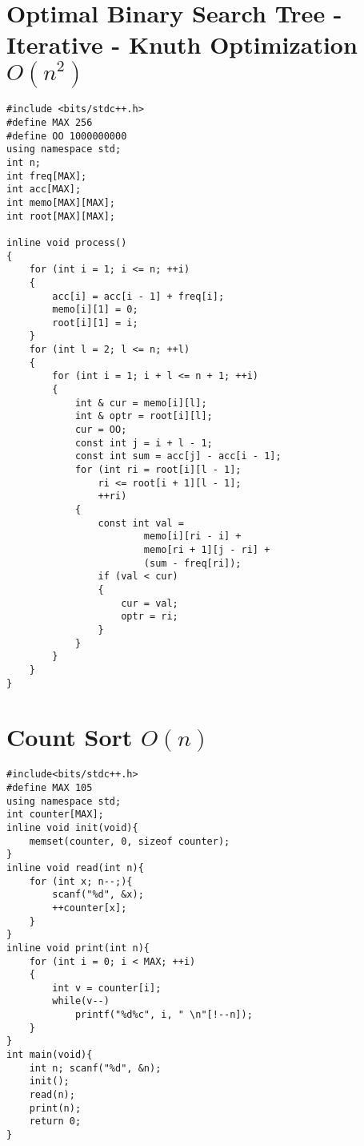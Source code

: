 \documentclass[12pt]{book}
\begin{document}
\section{Optimal Binary Search Tree - Iterative - Knuth Optimization $O(n^2)$}
\begin{verbatim}
#include <bits/stdc++.h>
#define MAX 256
#define OO 1000000000
using namespace std;
int n;
int freq[MAX];
int acc[MAX];
int memo[MAX][MAX];
int root[MAX][MAX];

inline void process()
{
	for (int i = 1; i <= n; ++i)
	{
		acc[i] = acc[i - 1] + freq[i];
		memo[i][1] = 0;
		root[i][1] = i;
	}
	for (int l = 2; l <= n; ++l)
	{
		for (int i = 1; i + l <= n + 1; ++i)
		{
			int & cur = memo[i][l];
			int & optr = root[i][l];
			cur = OO;
			const int j = i + l - 1;
			const int sum = acc[j] - acc[i - 1];
			for (int ri = root[i][l - 1];
				ri <= root[i + 1][l - 1];
				++ri)
			{
				const int val =
						memo[i][ri - i] +
						memo[ri + 1][j - ri] +
						(sum - freq[ri]);
				if (val < cur)
				{
					cur = val;
					optr = ri;
				}
			}
		}
	}
}
\end{verbatim}
\section{Count Sort $O(n)$}
\begin{verbatim}
#include<bits/stdc++.h>
#define MAX 105
using namespace std;
int counter[MAX];
inline void init(void){
	memset(counter, 0, sizeof counter);
}
inline void read(int n){
	for (int x; n--;){
		scanf("%d", &x);
		++counter[x];
	}
}
inline void print(int n){
	for (int i = 0; i < MAX; ++i)
	{
		int v = counter[i];
		while(v--)
			printf("%d%c", i, " \n"[!--n]);
	}
}
int main(void){
	int n; scanf("%d", &n);
	init();
	read(n);
	print(n);
	return 0;
}
\end{verbatim}
\end{document}
